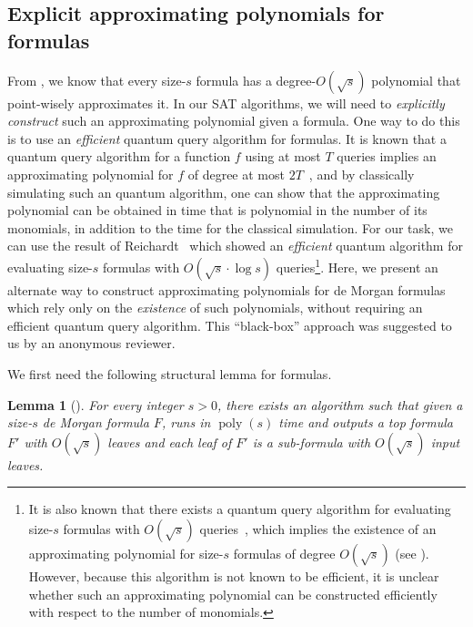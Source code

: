\documentclass[10pt,a4paper]{article}
\newtheorem{lemma}[theorem]{Lemma}
\newcommand{\bigo}[1]{O\left(#1\right)}
\newcommand{\poly}{\operatorname{poly}}
\begin{document}
%
%

    \subsection{Explicit approximating polynomials for formulas}
    
    From , we know that every size-$s$ formula has a degree-$O(\sqrt{s})$ polynomial that point-wisely approximates it. In our SAT algorithms, we will need to \emph{explicitly construct} such an approximating polynomial given a formula. One way to do this is to use an \emph{efficient} quantum query algorithm for formulas. It is known that a quantum query algorithm for a function $f$ using at most $T$ queries implies an approximating polynomial for $f$ of degree at most $2T$~\cite{BBC+01}, and by classically simulating such an quantum algorithm, one can show that the approximating polynomial can be obtained in time that is polynomial in the number of its monomials, in addition to the time for the classical simulation. For our task, we can use the result of Reichardt~\cite{Rei11a} which showed an \emph{efficient} quantum algorithm for evaluating size-$s$ formulas with $\bigo{\sqrt{s}\cdot \log s}$ queries\footnote{It is also known that there exists a quantum query algorithm for evaluating size-$s$ formulas with $\bigo{\sqrt{s}}$ queries~\cite{Rei11b}, which implies the existence of an approximating polynomial for size-$s$ formulas of degree $\bigo{\sqrt{s}}$ (see ). However, because this algorithm is not known to be efficient, it is unclear whether such an approximating polynomial can be constructed efficiently with respect to the number of monomials.}. Here, we present an alternate way to construct approximating polynomials for de Morgan formulas which rely only on the \emph{existence} of such polynomials, without requiring an efficient quantum query algorithm. This ``black-box'' approach was suggested to us by an anonymous reviewer.
    
    We first need the following structural lemma for formulas.
    
    \begin{lemma}[\cite{IMZ12,Tal14}]\label{lemma:sat-decomposing}
        For every integer $s>0$, there exists an algorithm such that given a size-$s$ de Morgan formula $F$, runs in $\poly(s)$ time and outputs a top formula $F'$ with $O(\sqrt{s})$ leaves and each leaf of $F'$ is a sub-formula with $O(\sqrt{s})$ input leaves.
    \end{lemma}
    
\end{document}
